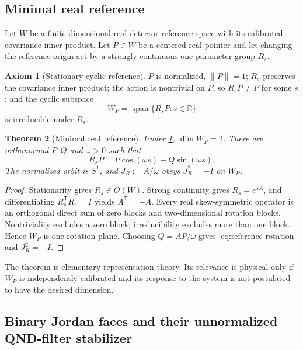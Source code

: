 \documentclass[10pt]{article}
\newtheorem{theorem}{Theorem}[section]
\theoremstyle{definition}
\newtheorem{axiom}[theorem]{Axiom}
\theoremstyle{remark}
\newcommand{\R}{\mathbb R}
\begin{document}
\subsection{Minimal real reference}

Let \(W\) be a finite-dimensional real detector-reference space with its calibrated covariance inner product. Let \(P\in W\) be a centered real pointer and let changing the reference origin act by a strongly continuous one-parameter group \(R_s\).

\begin{axiom}[Stationary cyclic reference]
\label{ax:reference}
\(P\) is normalized, \(\|P\|=1\); \(R_s\) preserves the covariance inner product; the action is nontrivial on \(P\), so \(R_sP\neq P\) for some \(s\); and the cyclic subspace
\[
W_P=\operatorname{span}\{R_sP:s\in\R\}
\]
is irreducible under \(R_s\).
\end{axiom}

\begin{theorem}[Minimal real reference]
\label{thm:minimal-reference}
Under \cref{ax:reference}, \(\dim W_P=2\). There are orthonormal \(P,Q\) and \(\omega>0\) such that
\begin{equation}
  R_sP=P\cos(\omega s)+Q\sin(\omega s).
  \label{eq:reference-rotation}
\end{equation}
The normalized orbit is \(S^1\), and \(J_R:=A/\omega\) obeys \(J_R^2=-I\) on \(W_P\).
\end{theorem}

\begin{proof}
Stationarity gives \(R_s\in O(W)\). Strong continuity gives \(R_s=e^{sA}\), and differentiating \(R_s^\mathsf TR_s=I\) yields \(A^\mathsf T=-A\). Every real skew-symmetric operator is an orthogonal direct sum of zero blocks and two-dimensional rotation blocks. Nontriviality excludes a zero block; irreducibility excludes more than one block. Hence \(W_P\) is one rotation plane. Choosing \(Q=AP/\omega\) gives \cref{eq:reference-rotation} and \(J_R^2=-I\).
\end{proof}

The theorem is elementary representation theory. Its relevance is physical only if \(W_P\) is independently calibrated and its response to the system is not postulated to have the desired dimension.

\subsection{Binary Jordan faces and their unnormalized QND-filter stabilizer}
\end{document}
